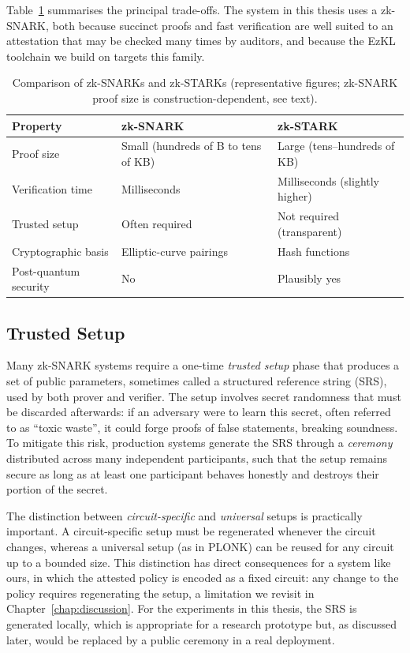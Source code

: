 \medskip

Table~\ref{tab:snark-stark} summarises the principal trade-offs. The system in this thesis uses a zk-SNARK, both because succinct proofs and fast verification are well suited to an attestation that may be checked many times by auditors, and because the EzKL toolchain we build on targets this family.

\begin{table}[h]
\centering
\caption{Comparison of zk-SNARKs and zk-STARKs (representative figures; zk-SNARK proof size is construction-dependent, see text).}
\label{tab:snark-stark}
\begin{tabular}{l l l}
\hline
\hline
Property & zk-SNARK & zk-STARK \\
\hline
Proof size & Small (hundreds of B to tens of KB) & Large (tens--hundreds of KB) \\
Verification time & Milliseconds & Milliseconds (slightly higher) \\
Trusted setup & Often required & Not required (transparent) \\
Cryptographic basis & Elliptic-curve pairings & Hash functions \\
Post-quantum security & No & Plausibly yes \\
\hline
\hline
\end{tabular}
\end{table}

\subsection{Trusted Setup}
\label{subsec:bg-setup}

Many zk-SNARK systems require a one-time \emph{trusted setup} phase that produces a set of public parameters, sometimes called a structured reference string (SRS), used by both prover and verifier. The setup involves secret randomness that must be discarded afterwards: if an adversary were to learn this secret, often referred to as ``toxic waste'', it could forge proofs of false statements, breaking soundness. To mitigate this risk, production systems generate the SRS through a \emph{ceremony} distributed across many independent participants, such that the setup remains secure as long as at least one participant behaves honestly and destroys their portion of the secret.

\medskip

The distinction between \emph{circuit-specific} and \emph{universal} setups is practically important. A circuit-specific setup must be regenerated whenever the circuit changes, whereas a universal setup (as in PLONK) can be reused for any circuit up to a bounded size. This distinction has direct consequences for a system like ours, in which the attested policy is encoded as a fixed circuit: any change to the policy requires regenerating the setup, a limitation we revisit in Chapter~\ref{chap:discussion}. For the experiments in this thesis, the SRS is generated locally, which is appropriate for a research prototype but, as discussed later, would be replaced by a public ceremony in a real deployment.

